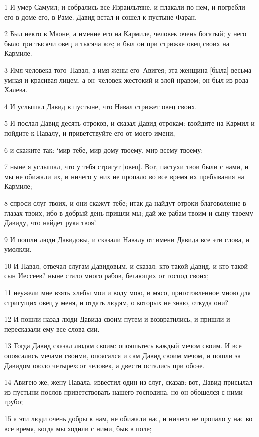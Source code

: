 \par 1 И умер Самуил; и собрались все Израильтяне, и плакали по нем, и погребли его в доме его, в Раме. Давид встал и сошел к пустыне Фаран.
\par 2 Был некто в Маоне, а имение его на Кармиле, человек очень богатый; у него было три тысячи овец и тысяча коз; и был он при стрижке овец своих на Кармиле.
\par 3 Имя человека того--Навал, а имя жены его--Авигея; эта женщина [была] весьма умная и красивая лицем, а он--человек жестокий и злой нравом; он был из рода Халева.
\par 4 И услышал Давид в пустыне, что Навал стрижет овец своих.
\par 5 И послал Давид десять отроков, и сказал Давид отрокам: взойдите на Кармил и пойдите к Навалу, и приветствуйте его от моего имени,
\par 6 и скажите так: `мир тебе, мир дому твоему, мир всему твоему;
\par 7 ныне я услышал, что у тебя стригут [овец]. Вот, пастухи твои были с нами, и мы не обижали их, и ничего у них не пропало во все время их пребывания на Кармиле;
\par 8 спроси слуг твоих, и они скажут тебе; итак да найдут отроки благоволение в глазах твоих, ибо в добрый день пришли мы; дай же рабам твоим и сыну твоему Давиду, что найдет рука твоя'.
\par 9 И пошли люди Давидовы, и сказали Навалу от имени Давида все эти слова, и умолкли.
\par 10 И Навал, отвечал слугам Давидовым, и сказал: кто такой Давид, и кто такой сын Иессеев? ныне стало много рабов, бегающих от господ своих;
\par 11 неужели мне взять хлебы мои и воду мою, и мясо, приготовленное мною для стригущих овец у меня, и отдать людям, о которых не знаю, откуда они?
\par 12 И пошли назад люди Давида своим путем и возвратились, и пришли и пересказали ему все слова сии.
\par 13 Тогда Давид сказал людям своим: опояшьтесь каждый мечом своим. И все опоясались мечами своими, опоясался и сам Давид своим мечом, и пошли за Давидом около четырехсот человек, а двести остались при обозе.
\par 14 Авигею же, жену Навала, известил один из слуг, сказав: вот, Давид присылал из пустыни послов приветствовать нашего господина, но он обошелся с ними грубо;
\par 15 а эти люди очень добры к нам, не обижали нас, и ничего не пропало у нас во все время, когда мы ходили с ними, быв в поле;

